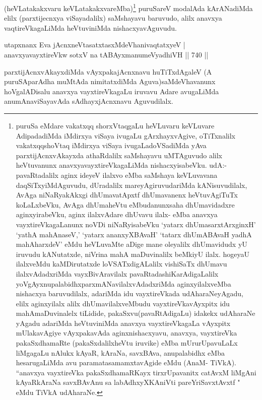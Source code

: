 \begin{artha}
(heVLatakakxvaru keVLatakakxvareMba)\footnote{puruSa eMdare vakatxqq shorxVtaqgaLu heVLuvaru keVLuvare AdipadadiMda iMdirxya viSaya ivugaLu gArxhayxvAgive, oTiTxnalilx vakatxqqshoVtaq iMdirxya viSaya ivugaLadoVSadiMda yAva parxtijAcnxvAkayxda athaRdalilx saMshayavu uMTAguvudo alilx heVtuvanunx anavxyavayxtireVkagaLiMda nishacxyisabeVku. udA:- pavaRtadalilx aginx ideyeV ilalxvo eMba saMshaya keVLuvavana daqSiTxyiMdAguvudu, dUradalilx mareyAgiruvudariMda kANisuvudilalx, AvAga niNaRyakAkxgi dhUmavatApxtf dhUmavanenx heVtuvAgiTuTx koLaLxbeVku, AvAga dhUmaheVtu eMbudanunxsaha dhUmavidadxre aginxyirabeVku, aginx ilalxvAdare dhUvavu ilalx- eMba anavxya vayxtireVkagaLanunx noVDi niNaRyisabeVku `yatarx dhUmasarxtArxginxH' `yathA mahAnaseV,' `yatarx ananxyXBAvaH' `tatarx dhUmABAvaH yadhA mahAharxdeV' eMdu heVLuvaMte aDige mane oleyalilx dhUmavidudx yU iruvudu kANutatxde, niVrina mahA maDuvinalilx beMkiyU ilalx. hogeyaU ilalxveMdu kaMDirutatxde loVSATxdigALalilx vishiSaTx dhUmavu ilalxvAdadxriMda vayxBivAravilalx pavaRtadashiKarAdigaLalilx yoVgAyxnupalabidhxparxmANavilalxvAdadxriMda aginxyilalxveMba nishacxya baruvudilalx, adariMda idu vayxtireVkada udAharaNeyAgadu, elilx aginxyilalx alilx dhUmavilalxveMbudu vayxtireVkavAyxpitx idu mahAmaDuvinalelx tiLidide, pakaSxvu(pavaRtAdigaLu) idakekx udAharaNe yAgadu adariMda heVtuviniMda anavxya vayxtireVkagaLa vAyxpitx mUlakavAgiye vAyxpakavAda aginxnishacxyavu, anavxya, vayxtireVka pakaSxdhamaRte (pakaSxdalilxheVtu iruvike) eMba mUrurUpavuLaLx liMgagaLu nAlukx kAyaR, kAraNa, savxBAva, anupalabidhx eMba hesarugaLiMda avu paramatasamamxtavAgide eMdu (AnaM- TiVkA). ``anavxya vayxtireVka pakaSxdhamaRKayx tirxrUpavanitx catAvxM liMgAni kAyaRkAraNa savxBAvAnu sa labAdhxyXKAniVti pareYriSavxtAvxtf " eMdu TiVkA udAharaNe.} puruSareV modalAda kArANadiMda elilx (parxtijecnxya viSayadalilx) saMshayavu baruvudo, alilx anavxya vaqtireVkagaLiMda heVtuviniMda nishacxyavAguvudu.
\end{artha}

\begin{shl}
utapxnanx Eva jAcnxneV\s tasatxtasxMdeVhanivaqtatxyeV | \\
anavxyavayxtireVkw sotxV na tABAyxmanumeVyadhiVH \hfill||  740 ||  
\end{shl}


\begin{artha}
parxtijAcnxvAkayxdiMda vAyxpakajAcnxnavu huTiTxdAgaleV (A puruSAparAdha muMtAda nimitatxdiMda Aguva)saMdeVhavanunx hoVgalADisalu anavxya vayxtireVkagaLu iruvavu Adare avugaLiMda anumAnaviSayavAda sAdhayxjAcnxnavu Aguvudilalx.
\end{artha}

